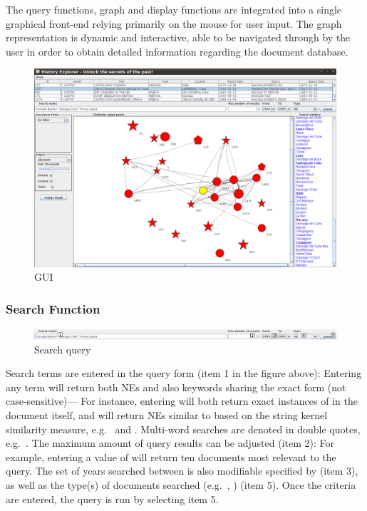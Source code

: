 The query functions, graph and display functions are integrated into a single graphical front-end relying primarily on the mouse for user input. The graph representation is dynamic and interactive, able to be navigated through by the user in order to obtain detailed information regarding the document database.

\begin{figure}[h]
\centering
\caption{GUI}
\includegraphics[width=160mm]{gui.png}
\end{figure}

\subsubsection{Search Function}
\begin{figure}[h]
\centering
\caption{Search query}
\includegraphics[width=160mm]{search.png}
\end{figure}

Search terms are entered in the query form (item 1 in the figure above): Entering any term will return both NEs and also keywords sharing the exact form (not case-sensitive)--- For instance, entering  will both return exact instances of  in the document itself, and will return NEs similar to  based on the string kernel similarity measure, e.g.\  and . Multi-word searches are denoted in double quotes, e.g.\ . The maximum amount of query results can be adjusted (item 2): For example, entering a value of  will return ten documents most relevant to the query. The set of years searched between is also modifiable specified by (item 3), as well as the type(s) of documents searched (e.g.\ , ) (item 5). Once the criteria are entered, the query is run by selecting item 5.

